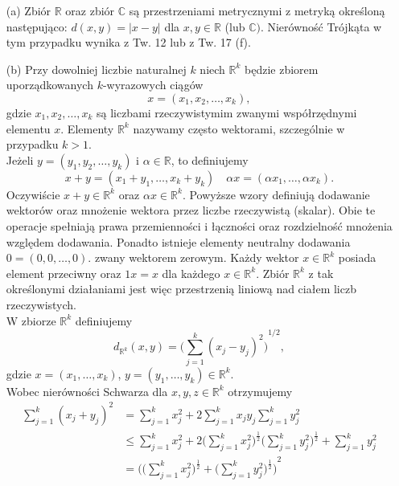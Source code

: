 \documentclass[leqno]{article}
\newcounter{excounter}
\begin{document}
\begin{justify}
\setcounter{excounter}{47}
\begin{ex}
    \begin{itemize}
        \item [(a)] Zbiór $\mathbb{R}$ oraz zbiór $\mathbb{C}$ są przestrzeniami metrycznymi z metryką określoną następująco:
        $d(x, y) = |x - y|$ dla $x, y \in \mathbb{R}$ (lub $\mathbb{C})$. Nierówność Trójkąta w tym przypadku wynika z Tw. 12 lub z Tw. 17 (f).
        \item [(b)] Przy dowolniej liczbie naturalnej $k$ niech $\mathbb{R}^k$ będzie zbiorem uporządkowanych $k$-wyrazowych ciągów
        \[
            x = (x_1, x_2, \ldots, x_k),
        \]
        gdzie $x_1, x_2, \ldots, x_k$ są liczbami rzeczywistymim zwanymi współrzędnymi elementu $x$.
        Elementy $\mathbb{R}^k$ nazywamy często wektorami, szczególnie w przypadku $k > 1$. \\
        Jeżeli $y = (y_1, y_2, \ldots, y_k)$ i $\alpha \in \mathbb{R}$, to definiujemy
        \[
            x + y = (x_1 + y_1, \ldots, x_k + y_k) \quad \alpha x = (\alpha x_1, \ldots, \alpha x_k).
        \]
        Oczywiście $x + y \in \mathbb{R}^k$ oraz $\alpha x \in \mathbb{R}^k$. Powyższe wzory definiują dodawanie wektorów oraz mnożenie
        wektora przez liczbe rzeczywistą (skalar). Obie te operacje spełniają prawa przemienności i łączności oraz rozdzielność mnożenia względem dodawania. 
        Ponadto istnieje elementy neutralny dodawania $0 = (0, 0, \ldots, 0)$. zwany wektorem zerowym. Każdy wektor $x \in \mathbb{R}^k$ posiada element przeciwny oraz $1x = x$
        dla każdego $x \in \mathbb{R}^k$. Zbiór $\mathbb{R}^k$ z tak określonymi działaniami jest więc przestrzenią liniową nad ciałem liczb rzeczywistych. \\
        W zbiorze $\mathbb{R}^k$ definiujemy 
        \[
            d_{\mathbb{R}^k}(x, y) = {\Bigg( \sum_{j=1}^{k}{(x_j - y_j)}^2\Bigg)}^{1/2},
        \]
        gdzie $x = (x_1, \ldots, x_k)$, $y = (y_1, \ldots, y_k) \in \mathbb{R}^k$. \\
        Wobec nierówności Schwarza dla $x, y, z \in \mathbb{R}^k$ otrzymujemy
        \begin{align*}
            \sum_{j=1}^{k}{(x_j + y_j)}^2 &= \sum_{j=1}^{k}x_j^2 + 2 \sum_{j=1}^{k}x_j y_j \sum_{j=1}^{k}y_j^2 \\
            &\leqslant \sum_{j=1}^{k}x_j^2 + 2\Bigg( \sum_{j=1}^{k}x_j^2\Bigg)^{\frac{1}{2}}\Bigg( \sum_{j=1}^{k}y_j^2\Bigg)^{\frac{1}{2}} + \sum_{j=1}^{k}y_j^2 \\
            &= {\Bigg(\Big(\sum_{j=1}^{k}x_j^2\Big)^{\frac{1}{2}} + \Big(\sum_{j=1}^{k}y_j^2\Big)^{\frac{1}{2}}\Bigg)}^2

\end{align*}
\end{itemize}
\end{ex}
\end{justify}
\end{document}
